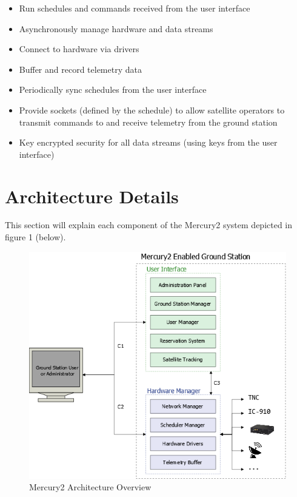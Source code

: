 \documentclass{mxl-design}
\begin{document}
\begin{itemize}
	\item Run schedules and commands received from the user interface
	\item Asynchronously manage hardware and data streams
	\item Connect to hardware via drivers
	\item Buffer and record telemetry data
	\item Periodically sync schedules from the user interface	
	\item Provide sockets (defined by the schedule) to allow satellite operators to transmit commands to and receive telemetry from the ground station
	\item Key encrypted security for all data streams (using keys from the user interface)
\end{itemize}

\clearpage
\part{Architecture Details}
This section will explain each component of the Mercury2 system depicted in figure 1 (below).

\begin{figure}[hbtp]
\centering
\includegraphics[scale=.55]{Architecture_Diagram.png}
\caption{Mercury2 Architecture Overview}
\end{figure}
\end{document}
